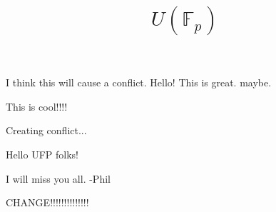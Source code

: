 \documentclass{amsart}
\begin{document}
I think this will cause a conflict. 
 Hello! This is great. maybe. 

This is cool!!!!

    \title{$U(\mathbb{F}_p)$}

Creating conflict...

    \maketitle

 Hello UFP folks!
 
 I will miss you all. -Phil

CHANGE!!!!!!!!!!!!!!
\end{document}
